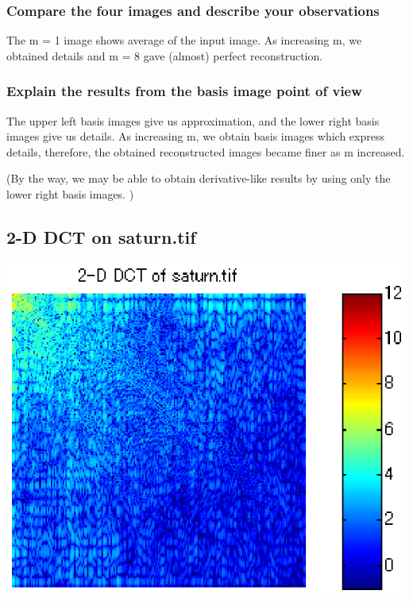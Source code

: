 \documentclass[12pt]{article}
\begin{document}
\subsubsection{Compare the four images and describe your observations}

The m = 1 image shows average of the input image. 
As increasing m, we obtained details and m = 8 gave (almost) perfect reconstruction. 

\subsubsection{Explain the results from the basis image point of view}

The upper left basis images give us approximation, and the lower right basis images give us details. 
As increasing m, we obtain basis images which express details, therefore, the obtained reconstructed images became finer as m increased. 

(By the way, we may be able to obtain derivative-like results by using only the lower right basis images. )


\subsection{2-D DCT on saturn.tif}

\begin{center}
\includegraphics{../images/II2dctimg.eps}
\end{center}
\end{document}
